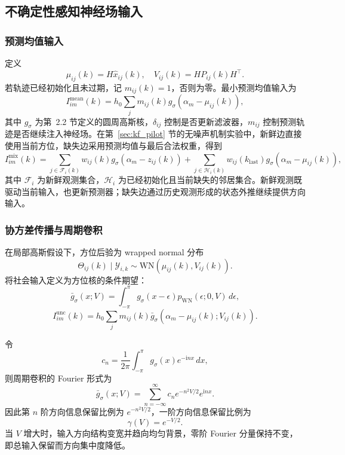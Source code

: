 \documentclass[UTF8,fontset=windows,11pt]{ctexart}
\begin{document}
\subsection{不确定性感知神经场输入}

\subsubsection{预测均值输入}
定义
\begin{equation}
 \mu_{ij}(k)=H\hat x_{ij}(k),\quad V_{ij}(k)=HP_{ij}(k)H^\top.
\end{equation}
若轨迹已经初始化且未过期，记 $m_{ij}(k)=1$，否则为零。最小预测均值输入为
\begin{equation}
 I^{\mathrm{mean}}_{im}(k)=h_0\sum_jm_{ij}(k)
 g_\sigma(\alpha_m-\mu_{ij}(k)),
\end{equation}
其中 $g_\sigma$ 为第~2.2 节定义的圆周高斯核，$\delta_{ij}$ 控制是否更新滤波器，$m_{ij}$ 控制预测轨迹是否继续注入神经场。在第~\ref{sec:kf_pilot} 节的无噪声机制实验中，新鲜边直接使用当前方位，缺失边采用预测均值与最后合法权重，得到
\begin{equation}
 I^{\mathrm{mix}}_{im}(k)
 =\sum_{j\in\mathcal F_i(k)}w_{ij}(k)g_\sigma(\alpha_m-z_{ij}(k))
 +\sum_{j\in\mathcal H_i(k)}w_{ij}(k_{\mathrm{last}})
 g_\sigma(\alpha_m-\mu_{ij}(k)),
 \label{eq:pilot_causal_input}
\end{equation}
其中 $\mathcal F_i$ 为新鲜观测集合，$\mathcal H_i$ 为已经初始化且当前缺失的邻居集合。新鲜观测既驱动当前输入，也更新预测器；缺失边通过历史观测形成的状态外推继续提供方向输入。

\subsubsection{协方差传播与周期卷积}
在局部高斯假设下，方位后验为 wrapped normal 分布
\begin{equation}
 \Theta_{ij}(k)\mid\mathcal Y_{i,k}\sim\mathrm{WN}(\mu_{ij}(k),V_{ij}(k)).
\end{equation}
将社会输入定义为方位核的条件期望：
\begin{equation}
 \bar g_\sigma(x;V)=\int_{-\pi}^{\pi}g_\sigma(x-\epsilon)p_{\mathrm{WN}}(\epsilon;0,V)\,d\epsilon,
\end{equation}
\begin{equation}
 I^{\mathrm{unc}}_{im}(k)=h_0\sum_jm_{ij}(k)\bar g_\sigma(\alpha_m-\mu_{ij}(k);V_{ij}(k)).
\end{equation}

令
\begin{equation}
 c_n=\frac{1}{2\pi}\int_{-\pi}^{\pi}g_\sigma(x)e^{-\mathrm inx}\,dx,
\end{equation}
则周期卷积的 Fourier 形式为
\begin{equation}
 \bar g_\sigma(x;V)=\sum_{n=-\infty}^{\infty}c_n e^{-n^2V/2}e^{\mathrm inx}.
\end{equation}
因此第 $n$ 阶方向信息保留比例为 $e^{-n^2V/2}$，一阶方向信息保留比例为
\begin{equation}
 \gamma(V)=e^{-V/2}.
\end{equation}
当 $V$ 增大时，输入方向结构变宽并趋向均匀背景，零阶 Fourier 分量保持不变，即总输入保留而方向集中度降低。
\end{document}
